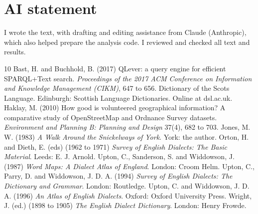 \documentclass[11pt,a4paper]{article}
\begin{document}
\section*{AI statement}
I wrote the text, with drafting and editing assistance from Claude (Anthropic), which also helped prepare the analysis code. I reviewed and checked all text and results.

\begin{thebibliography}{10}
 Bast, H. and Buchhold, B. (2017) QLever: a query engine for efficient SPARQL+Text search. \textit{Proceedings of the 2017 ACM Conference on Information and Knowledge Management (CIKM)}, 647 to 656.
 Dictionary of the Scots Language. Edinburgh: Scottish Language Dictionaries. Online at dsl.ac.uk.
 Haklay, M. (2010) How good is volunteered geographical information? A comparative study of OpenStreetMap and Ordnance Survey datasets. \textit{Environment and Planning B: Planning and Design} 37(4), 682 to 703.
 Jones, M. W. (1983) \textit{A Walk Around the Snickelways of York}. York: the author.
 Orton, H. and Dieth, E. (eds) (1962 to 1971) \textit{Survey of English Dialects: The Basic Material}. Leeds: E. J. Arnold.
 Upton, C., Sanderson, S. and Widdowson, J. (1987) \textit{Word Maps: A Dialect Atlas of England}. London: Croom Helm.
 Upton, C., Parry, D. and Widdowson, J. D. A. (1994) \textit{Survey of English Dialects: The Dictionary and Grammar}. London: Routledge.
 Upton, C. and Widdowson, J. D. A. (1996) \textit{An Atlas of English Dialects}. Oxford: Oxford University Press.
 Wright, J. (ed.) (1898 to 1905) \textit{The English Dialect Dictionary}. London: Henry Frowde.
\end{thebibliography}
\end{document}
